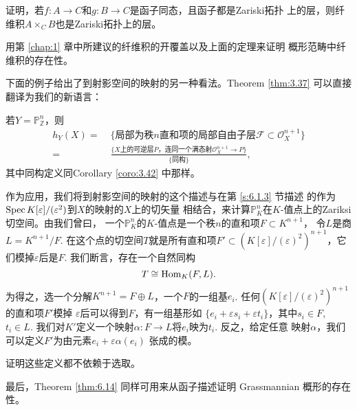 \begin{exe}\label{exe:6.15}
\begin{compactenum}[(a)]
\item 证明，若$f:A\to C$和$g:B\to C$是函子同态，且函子都是Zariski拓扑
    上的层，则纤维积$A\times_C B$也是Zariski拓扑上的层。
\item 用第 \ref{chap:1} 章中所建议的纤维积的开覆盖以及上面的定理来证明
    概形范畴中纤维积的存在性。
\end{compactenum}
\end{exe}

下面的例子给出了到射影空间的映射的另一种看法。Theorem \ref{thm:3.37}
可以直接翻译为我们的新语言：

\begin{thm}\label{thm:6.16}
若$Y=\mathbb P_{\mathbb Z}^n$，则
\begin{align*}
h_Y(X)=&
\;\{\text{局部为秩$n$直和项的局部自由子层$\mathscr F\subset 
\mathscr O_X^{n+1}$}\}\\
=&\; \frac{\{\text{$X$上的可逆层$P$，连同一个满态射$\mathscr O_X^{n+1}
\to P$}\}}{\{\text{同构}\}},
\end{align*}
其中同构定义同Corollary \ref{coro:3.42} 中那样。
\end{thm}

作为应用，我们将到射影空间的映射的这个描述与在第 \ref{s:6.1.3} 节描述
的作为$\operatorname{Spec} K[\varepsilon]/(\varepsilon^2)$到$X$的映射的$X$上的切矢量
相结合，来计算$\mathbb P_K^n$在$K$-值点上的Zariksi切空间。由我们曾曰，
一个$\mathbb P_K^n$的$K$-值点是一个秩$n$的直和项$F\subset K^{n+1}$，
令$L$是商$L=K^{n+1}/F$. 在这个点的切空间$T$就是所有直和项$F'\subset 
(K[\varepsilon]/(\varepsilon)^2)^{n+1}$，它们模掉$\varepsilon$后是$F$.
我们断言，存在一个自然同构
\[
T\cong \operatorname{Hom}_K(F,L).   
\]
为得之，选一个分解$K^{n+1}=F\oplus L$，一个$F$的一组基$e_i$. 
任何$(K[\varepsilon]/(\varepsilon)^2)^{n+1}$的直和项$F'$模掉
$\varepsilon$后可以得到$F$，有一组基形如
$\{e_i+\varepsilon s_i+\varepsilon t_i\}$，其中$s_i\in F$, $t_i\in L$.
我们对$K'$定义一个映射$\alpha:F\to L$将$e_i$映为$t_i$. 反之，给定任意
映射$\alpha$，我们可以定义$F'$为由元素$e_i+\varepsilon\alpha(e_i)$
张成的模。

\begin{exe}\label{exe:6.17}
证明这些定义都不依赖于选取。
\end{exe}

最后，Theorem \ref{thm:6.14} 同样可用来从函子描述证明 Grassmannian
概形的存在性。


